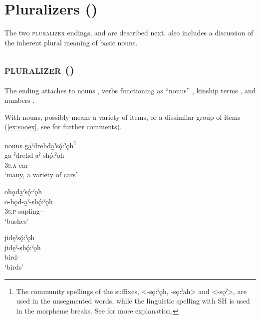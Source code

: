 \section{Pluralizers ({\pluralizer})} \label{Pluralizers}
The two \textsc{pluralizer} endings,  {\pluralizer} and  {\pluralizer} are described next.  also includes a discussion of the inherent plural meaning of basic nouns.


\subsection{ \textsc{pluralizer} ({\pluralizer})} \label{-sǫ:ˀǫh}
The  \textsc{\pluralizer} ending attaches to nouns , verbs functioning as “nouns” , kinship terms , and numbers .

With nouns,  {\pluralizer} possibly means a variety of items, or a dissimilar group of items (\ref{ex:sooex}, see  for further comments).

\ea\label{ex:sooex} nouns
\ea ga̱ˀdrehda̱ˀsǫ́:ˀǫh\footnote{The community spellings of the {\pluralizer} suffixes,  <-sǫ:ˀǫh, -sǫ:ˀah> and <-sǫˀ>, are used in the unsegmented words, while the linguistic spelling with SH is used in the morpheme breaks. See  for more explanation.}\\
\gll ga̱-ˀdrehd-aˀ-shǫ́:ˀǫh\\
 \textsc{3s.a}-car-{\nsf}-{\pluralizer}\\
\glt `many, a variety of cars'


\ex ohǫda̱ˀsǫ́:ˀǫh\\
\gll o-hǫd-a̱ˀ-shǫ́:ˀǫh\\
 \textsc{3s.p}-sapling-{\nsf}-{\pluralizer}\\
\glt `bushes'


\ex jidęˀsǫ́:ˀǫh\\
\gll jidęˀ-shǫ́:ˀǫh\\
 bird-{\pluralizer}\\
\glt `birds'

